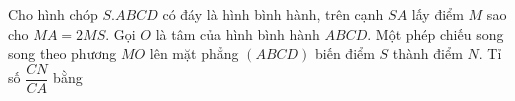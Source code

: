 \begin{ex}
Cho hình chóp $S.ABCD$ có đáy là hình bình hành, trên cạnh $SA$ lấy điểm $M$ sao cho $MA=2MS$. Gọi $O$ là tâm của hình bình hành $ABCD$. Một phép chiếu song song theo phương $MO$ lên mặt phẳng $(ABCD)$ biến điểm $S$ thành điểm $N$. Tỉ số $\dfrac{CN}{CA}$ bằng
\end{ex}
